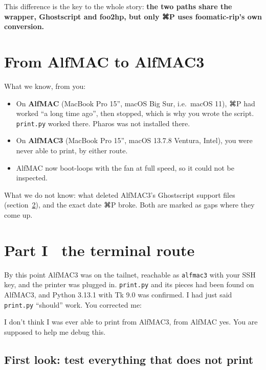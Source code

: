 \documentclass[11pt,a4paper]{article}
\newcommand{\bugemo}{\texttwemoji{lady beetle}}
\begin{document}
This difference is the key to the whole story: \textbf{the two paths share the wrapper, Ghostscript and foo2hp, but only ⌘P uses foomatic-rip's own conversion.}


\section{From AlfMAC to AlfMAC3}\label{sec:history}

What we know, from you:
\begin{itemize}[nosep]
  \item On \textbf{AlfMAC} (MacBook Pro 15'', macOS Big Sur, i.e.\ macOS 11), ⌘P had worked ``a long time ago'', then stopped, which is why you wrote the script. \texttt{print.py} worked there. Pharos was not installed there.
  \item On \textbf{AlfMAC3} (MacBook Pro 15'', macOS 13.7.8 Ventura, Intel), you were never able to print, by either route.
  \item AlfMAC now boot-loops with the fan at full speed, so it could not be inspected.
\end{itemize}

What we do not know: what deleted AlfMAC3's Ghostscript support files (section~\ref{sec:break1}), and the exact date ⌘P broke. Both are marked as gaps where they come up.

\section{Part I \texorpdfstring{\bugemo\ }{: }the terminal route}\label{sec:break1}

By this point AlfMAC3 was on the tailnet, reachable as \texttt{alfmac3} with your SSH key, and the printer was plugged in. \texttt{print.py} and its pieces had been found on AlfMAC3, and Python 3.13.1 with Tk 9.0 was confirmed. I had just said \texttt{print.py} ``should'' work. You corrected me:

\begin{alf}
I don't think I was ever able to print from AlfMAC3, from AlfMAC yes. You are supposed to help me debug this.
\end{alf}

\subsection{First look: test everything that does not print}
\end{document}
